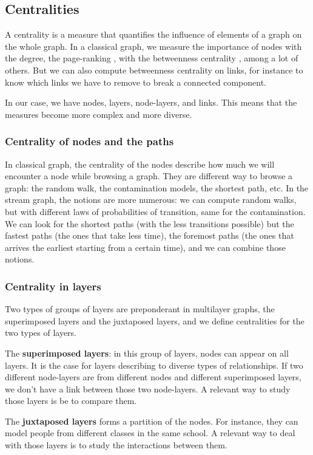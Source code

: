 \documentclass{svproc}
\begin{document}
\subsection{Centralities}
%
A centrality is a measure that quantifies the influence of elements of a graph on the whole graph. In a classical graph, we measure the importance of nodes with the degree, the page-ranking \cite{pr}, with the betweenness centrality \cite{btw}, among a lot of others. But we can also compute betweenness centrality on links, for instance to know which links we have to remove to break a connected component.

In our case, we have nodes, layers, node-layers, and links. This means that the measures become more complex and more diverse.
%
\subsubsection{Centrality of nodes and the paths}
%
In classical graph, the centrality of the nodes describe how much we will encounter a node while browsing a graph. They are different way to browse a graph: the random walk, the contamination models, the shortest path, etc. In the stream graph, the notions are more numerous: we can compute random walks, but with different laws of probabilities of transition, same for the contamination. We can look for the shortest paths (with the less transitions possible) but the fastest paths (the ones that take less time), the foremost paths (the ones that arrives the earliest starting from a certain time), and we can combine those notions.



\subsubsection{Centrality in layers}

Two types of groups of layers are preponderant in multilayer graphs, the superimposed layers and the juxtaposed layers, and we define centralities for the two types of layers.

The {\bf superimposed layers}: in this group of layers, nodes can appear on all layers. It is the case for layers describing to diverse types of relationships. If two different node-layers are from different nodes and different superimposed layers, we don't have a link between those two node-layers. A relevant way to study those layers is be to compare them.

The {\bf juxtaposed layers} forms a partition of the nodes. For instance, they can model people from different classes in the same school. A relevant way to deal with those layers is to study the interactions between them.
\end{document}
